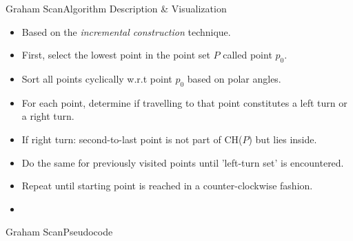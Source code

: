 \documentclass{beamer}
\begin{document}
 \begin{frame}[t]{Graham Scan}{Algorithm Description \& Visualization}
    \begin{itemize}
        \item Based on the \textit{incremental construction} technique.
        \item First, select the lowest point in the point set $P$ called point $p_0$.
        \item Sort all points cyclically w.r.t point $p_0$ based on polar angles.
        \item For each point, determine if travelling to that point constitutes a left turn or a right turn.
        \item If right turn: second-to-last point is not part of CH($P$) but lies inside.
        \item Do the same for previously visited points until 'left-turn set' is encountered.
        \item Repeat until starting point is reached in a counter-clockwise fashion. 
        \item \href{https://upload.wikimedia.org/wikipedia/commons/7/71/GrahamScanDemo.gif}
        {\color{magenta}{Link to visualization.}}
    \end{itemize}
 \end{frame}
  
\begin{frame}{Graham Scan}{Pseudocode}
\begin{center}
\end{center}
\end{frame}
 
\end{document}
